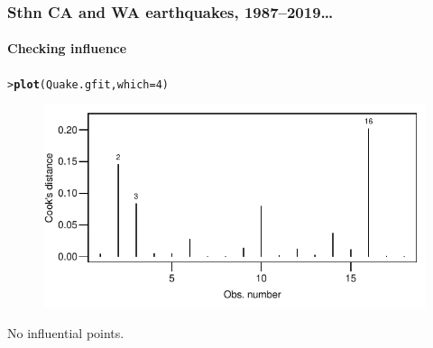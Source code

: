 \documentclass{beamer}\usepackage[]{graphicx}\usepackage[]{xcolor}
\makeatletter
\newcommand{\hlnum}[1]{\textcolor[rgb]{0.686,0.059,0.569}{#1}}%
\newcommand{\hlstd}[1]{\textcolor[rgb]{0.345,0.345,0.345}{#1}}%
\newcommand{\hlkwc}[1]{\textcolor[rgb]{0.333,0.667,0.333}{#1}}%
\newcommand{\hlkwd}[1]{\textcolor[rgb]{0.737,0.353,0.396}{\textbf{#1}}}%
\newenvironment{kframe}{%
 \def\at@end@of@kframe{}%
 \ifinner\ifhmode%
  \def\at@end@of@kframe{\end{minipage}}%
  \begin{minipage}{\columnwidth}%
 \fi\fi%
 \def\FrameCommand##1{\hskip\@totalleftmargin \hskip-\fboxsep
 \colorbox{shadecolor}{##1}\hskip-\fboxsep
     \hskip-\linewidth \hskip-\@totalleftmargin \hskip\columnwidth}%
 \MakeFramed {\advance\hsize-\width
   \@totalleftmargin\z@ \linewidth\hsize
   \@setminipage}}%
 {\par\unskip\endMakeFramed%
 \at@end@of@kframe}
\newenvironment{knitrout}{}{} %
\makeatother
\begin{document}
\begin{frame}[fragile]
\frametitle{Sthn CA and WA earthquakes, 1987--2019\ldots}
\framesubtitle{Checking influence}

\begin{knitrout}\scriptsize
{}\color{fgcolor}\begin{kframe}
\begin{alltt}
\hlstd{> }\hlkwd{plot}\hlstd{(Quake.gfit,} \hlkwc{which} \hlstd{=} \hlnum{4}\hlstd{)}
\end{alltt}
\end{kframe}
\end{knitrout}



\begin{figure}
  \centering
  \includegraphics[scale=0.7]{figure/RC-H14-007b}
\end{figure}

No influential points. 
\end{frame}
\end{document}
